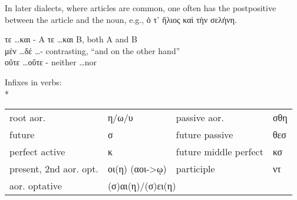 \begin{small}

In later dialects, where articles are common, one often has
the postpositive between the article and the noun, e.g.,
ὁ τ᾽ ἥλιος καὶ τὴν σελήνη.

τε \ldots και - A τε \ldots και Β, both A and B\\
μέν \ldots δέ \ldots - contrasting, ``and on the other hand''\\
οὔτε \ldots οὔτε - neither \ldots nor\\

\vfill

\pagebreak


\newcommand{\tca}{\cellcolor{TableColorA}}
\newcommand{\tcb}{\cellcolor{TableColorB}}

Infixes in verbs:\\*
%
\begin{tabular}{llll}
root aor.         & η/ω/υ & passive aor.      & σθη \\
future              & σ     & future passive      & θεσ \\
perfect active      & κ     & future middle perfect & κσ \\
present, 2nd aor. opt.    & οι(η) (αοι->ῳ) & participle        & ντ\footnotemark \\
aor. optative     & \multicolumn{3}{l}{(σ)αι(η)/(σ)ει(η)}\\
\end{tabular}


\end{small}
